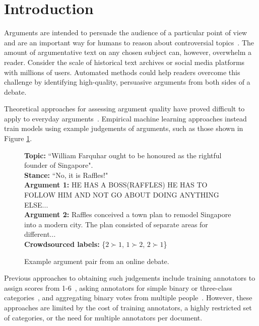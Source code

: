 \section{Introduction}\label{sec:intro}

Arguments are intended to persuade the audience of a particular point of view and 
are an important way for humans to reason about controversial topics~\cite{mercier2011humans}. 
The amount of argumentative text on any chosen subject can, however, overwhelm a reader.
Consider the scale of historical text archives 
or social media platforms with millions of users.
Automated methods could help readers overcome this challenge 
 by identifying high-quality, persuasive arguments from both sides of a debate. 
 
Theoretical approaches for assessing argument quality have proved difficult to apply to everyday arguments~\cite{boudry2015fake}.
Empirical machine learning approaches instead train models using example judgements of arguments,
such as those shown in Figure \ref{fig:argument_examples}.
\begin{figure}
\textbf{Topic:} ``William Farquhar ought to be honoured as the rightful founder of Singapore". \\
\textbf{Stance:} ``No, it is Raffles!" \\
\textbf{Argument 1:}  
HE HAS A BOSS(RAFFLES) HE HAS TO FOLLOW HIM AND NOT GO ABOUT DOING ANYTHING ELSE... \\
\textbf{Argument 2:} 
Raffles conceived a town plan to remodel Singapore into a modern city. The plan consisted of separate areas for different...\\
\textbf{Crowdsourced labels:} \{$2 \succ 1$, $1 \succ 2$, $2 \succ 1$\} 
\caption{Example argument pair from an online debate.}
\label{fig:argument_examples}
\end{figure}
Previous approaches to obtaining such judgements include training annotators to assign scores from 1-6~\cite{persing2017can}, 
asking annotators for simple binary or three-class categories~\cite{wei2016preliminary}, and
aggregating binary votes from multiple people~\cite{wei2016post,tan2016winning}.
However, these approaches are limited by the cost of training annotators, 
a highly restricted set of categories, or %
the need for multiple annotators per document.

